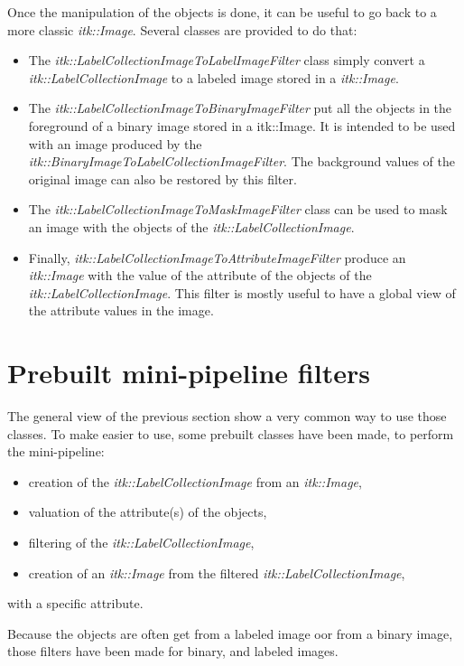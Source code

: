 \documentclass{InsightArticle}
\begin{document}
Once the manipulation of the objects is done, it can be useful to go back to a
more classic {\em itk::Image}. Several classes are provided to do that:
\begin{itemize}
  \item The {\em itk::LabelCollectionImageToLabelImageFilter} class simply
convert a {\em itk::LabelCollectionImage} to a labeled image stored in a {\em
itk::Image}.
  \item The {\em itk::LabelCollectionImageToBinaryImageFilter} put all the
objects in the foreground of a binary image stored in a {itk::Image}. It is
intended to be used with an image produced by the {\em
itk::BinaryImageToLabelCollectionImageFilter}. The background values of the
original image can also be restored by this filter.
  \item The {\em itk::LabelCollectionImageToMaskImageFilter} class can be used
to mask an image with the objects of the {\em itk::LabelCollectionImage}.
  \item Finally, {\em itk::LabelCollectionImageToAttributeImageFilter} produce
an {\em itk::Image} with the value of the attribute of the objects of the {\em
itk::LabelCollectionImage}. This filter is mostly useful to have a global view
of the attribute values in the image.
\end{itemize}

\section{Prebuilt mini-pipeline filters}

The general view of the previous section show a very common way to use those
classes. To make easier to use, some prebuilt classes have been made, to perform
the mini-pipeline:
\begin{itemize}
  \item creation of the {\em itk::LabelCollectionImage} from an {\em
itk::Image},
  \item valuation of the attribute(s) of the objects,
  \item filtering of the {\em itk::LabelCollectionImage},
  \item creation of an {\em itk::Image} from the filtered {\em
itk::LabelCollectionImage},
\end{itemize}
with a specific attribute.

Because the objects are often get from a labeled image oor from a binary image,
those filters have been made for binary, and labeled images.
\end{document}
